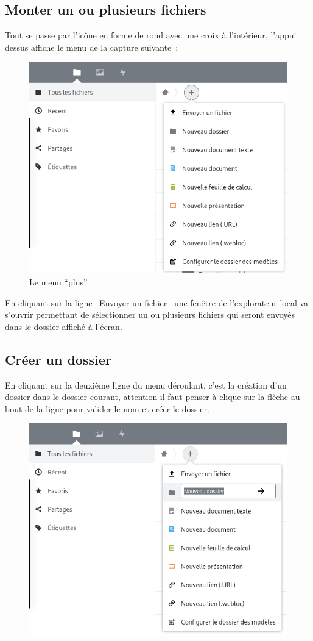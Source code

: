 \subsection{Monter un ou plusieurs fichiers}
Tout se passe par l'icône en forme de rond avec une croix à l'intérieur, l'appui dessus affiche le menu de la capture suivante~:
\begin{figure}
	\centering
	\includegraphics[width=0.7071\linewidth]{./Captures/nuage.menu.plus.png}
	\caption{Le menu ``plus''}
\end{figure}
En cliquant sur la ligne \og~Envoyer un fichier~\fg{} une fenêtre de l'explorateur local va s'ouvrir permettant de sélectionner un ou plusieurs fichiers qui seront envoyés dans le dossier affiché à l'écran.

\subsection{Créer un dossier}
En cliquant sur la deuxième ligne du menu déroulant, c'est la création d'un dossier dans le dossier courant, attention il faut penser à clique sur la flèche au bout de la ligne pour valider le nom et créer le dossier.
\begin{figure}
	\centering
	\includegraphics[width=0.7071\linewidth]{./Captures/nuage.menu.plus.creer.dossier.png}
	\caption{}
\end{figure}


